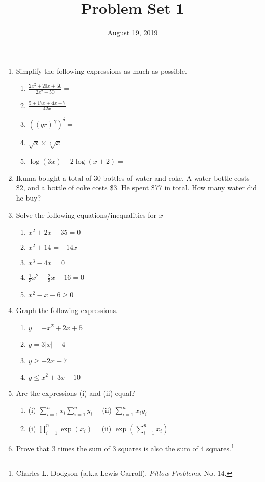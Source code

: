 \documentclass[pdflatex, letterpaper, 12pt]{scrartcl}
\title{Problem Set 1}
\date{August 19, 2019}
\begin{document}
\maketitle

\begin{enumerate}
\item Simplify the following expressions as much as possible.
 \begin{enumerate}[label=(\alph*)]
 \item $\frac{2x^2 + 20x + 50}{2 x^2 - 50} = $ 
 \item $\frac{5 + 17x + 4x + 7}{42x} = $
 \item $((qr)^{\gamma})^{\delta} = $
 \item $\sqrt{x} \times \sqrt[5]{x} = $
 \item $\log(3x) - 2\log(x + 2) = $
 \end{enumerate}

 \item Ikuma bought a total of 30 bottles of water and coke. A water bottle costs \$2, and a bottle of coke costs \$3. He spent \$77 in total. How many water did he buy?

 \item Solve the following equations/inequalities for $x$
 \begin{enumerate}[label=(\alph*)]
 \item $x^2 + 2x - 35 = 0$
 \item $x^2 + 14 = -14x$
 \item $x^3 - 4x = 0$
 \item $\frac{1}{3}x^2 + \frac{2}{3}x - 16 = 0$
 \item $x^2 - x - 6 \geq 0$ 
 \end{enumerate}

 \item Graph the following expressions.
 \begin{enumerate}[label=(\alph*)]
 \item $y = -x^2 + 2x + 5$
 \item $y = 3|x| - 4$
 \item $y \geq -2x + 7$
 \item $y \leq x^2 + 3x - 10$
 \end{enumerate}
 
 \item Are the expressions (i) and (ii) equal?
 \begin{enumerate}[label=(\alph*)]
 \item (i) $\sum_{i = 1}^{n} x_i \sum_{i = 1}^{n} y_i$ \ \ (ii) $\sum_{i = 1}^{n} x_i y_i$
 \item (i) $\prod_{i = 1}^{n} \exp(x_i)$ \ \ (ii) $\exp(\sum_{i = 1}^{n} x_i)$
 \end{enumerate}

 \item Prove that 3 times the sum of 3 squares is also the sum of 4 squares.\footnote{Charles L. Dodgson (a.k.a Lewis Carroll). \emph{Pillow Problems}. No. 14.}

 \end{enumerate}
\end{document}
